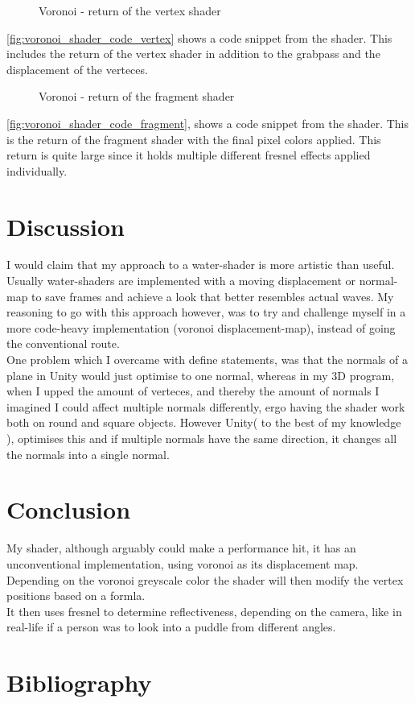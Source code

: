 \documentclass{article}
\begin{document}
\begin{figure}[H]
    \centering
    
    \caption{Voronoi - return of the vertex shader}
    \label{fig:voronoi_shader_code_vertex}
\end{figure}
\autoref{fig:voronoi_shader_code_vertex} shows a code snippet from the shader. This includes the return of the vertex shader in addition to the grabpass and the displacement of the verteces.

\begin{figure}[H]
    \centering
    
    \caption{Voronoi - return of the fragment shader}
    \label{fig:voronoi_shader_code_fragment}
\end{figure}
\autoref{fig:voronoi_shader_code_fragment}, shows a code snippet from the shader. This is the return of the fragment shader with the final pixel colors applied. This return is quite large since it holds multiple different fresnel effects applied individually.

\section{Discussion}
\label{sec:discussion}
I would claim that my approach to a water-shader is more artistic than useful. Usually water-shaders are implemented with a moving displacement or normal-map to save frames and achieve a look that better resembles actual waves. My reasoning to go with this approach however, was to try and challenge myself in a more code-heavy implementation (voronoi displacement-map), instead of going the conventional route.\\

One problem which I overcame with define statements, was that the normals of a plane in Unity would just optimise to one normal, whereas in my 3D program, when I upped the amount of verteces, and thereby the amount of normals I imagined I could affect multiple normals differently, ergo having the shader work both on round and square objects. However Unity( to the best of my knowledge ), optimises this and if multiple normals have the same direction, it changes all the normals into a single normal.

\section{Conclusion}
\label{sec:conclusion}
My shader, although arguably could make a performance hit, it has an unconventional implementation, using voronoi as its displacement map. Depending on the voronoi greyscale color the shader will then modify the vertex positions based on a formla.\\It then uses fresnel to determine reflectiveness, depending on the camera, like in real-life if a person was to look into a puddle from different angles.


\section{Bibliography}
\printbibliography
\end{document}
